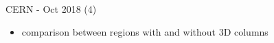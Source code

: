 \begin{frame}{CERN - Oct 2018 (4)}

	
	\begin{itemize}\itemfill
		\item comparison between regions with and without 3D columns
	\end{itemize}
	
\end{frame}
